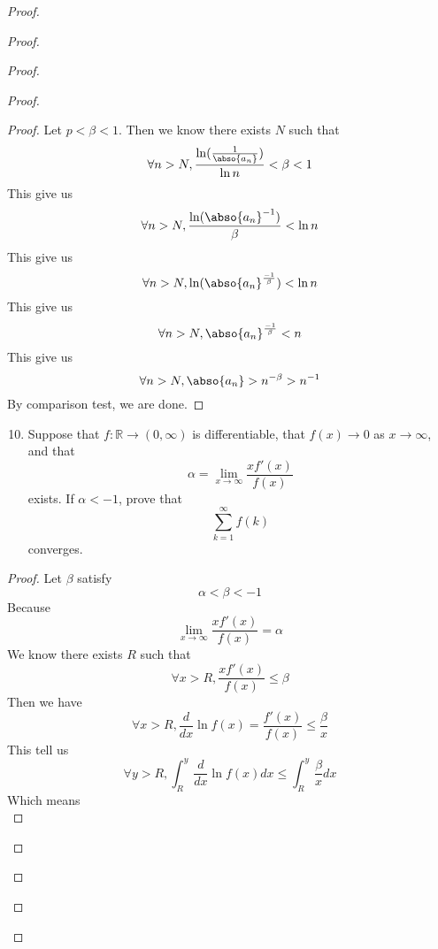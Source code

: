 \documentclass{report}
\begin{document}
\begin{proof}
\begin{proof}
\begin{proof}
\begin{proof}
\begin{proof}
Let $p<\beta <1$. Then we know there exists $N$ such that
\begin{equation}
\forall n>N, \frac{\ln (\frac{1}{\abso{a_n}})}{\ln n}<\beta <1
\end{equation}
This give us
\begin{equation}
  \forall n>N, \frac{\ln(\abso{a_n}^{-1})}{\beta }<\ln n
\end{equation}
This give us
\begin{equation}
\forall n>N, \ln(\abso{a_n}^{\frac{-1}{\beta }})<\ln n 
\end{equation}
This give us
\begin{equation}
\forall n>N, \abso{a_n}^{\frac{-1}{\beta }}<n
\end{equation}
This give us
\begin{equation}
\forall n>N, \abso{a_n}>n^{-\beta }>n^{-1}
\end{equation}
By comparison test, we are done.
\end{proof}
\begin{question}{}{}
\begin{enumerate}
    \setcounter{enumi}{9}
    \item Suppose that \( f : \mathbb{R} \to (0,\infty) \) is differentiable, that \( f(x) \to 0 \) as \( x \to \infty \), and that
    \[
    \alpha = \lim_{{x \to \infty}} \frac{xf'(x)}{f(x)}
    \]
    exists. If \( \alpha < -1 \), prove that
    \[
    \sum_{k=1}^{\infty} f(k)
    \]
    converges.
\end{enumerate}
\end{question}
\begin{proof}
Let $\beta $ satisfy
\begin{equation}
\alpha<\beta <-1 
\end{equation}
Because
\begin{equation}
\lim_{x\to\infty}\frac{xf'(x)}{f(x)}=\alpha 
\end{equation}
We know there exists $R$ such that
\begin{equation}
\forall x>R, \frac{xf'(x)}{f(x)}\leq \beta 
\end{equation}
Then we have
\begin{equation}
\forall x>R, \frac{d}{dx}\ln f(x)=\frac{f'(x)}{f(x)}\leq \frac{\beta }{x}
\end{equation}
This tell us 
\begin{equation}
  \forall y>R, \int^y_R \frac{d}{dx}\ln f(x)dx\leq \int^y_R \frac{\beta}{x}dx
\end{equation}
Which means
\begin{equation}

\end{equation}
\end{proof}
\end{proof}
\end{proof}
\end{proof}
\end{proof}
\end{document}
